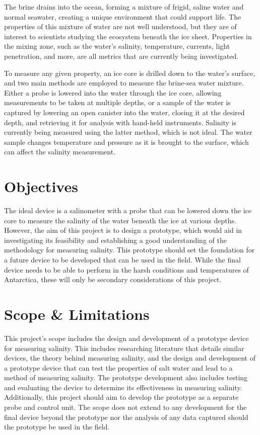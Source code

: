 The brine drains into the ocean, forming a mixture of frigid, saline water and normal seawater, creating a unique environment that could support life.
The properties of this mixture of water are not well understood, but they are of interest to scientists studying the ecosystem beneath the ice sheet.
Properties in the mixing zone, such as the water's salinity, temperature, currents, light penetration, and more, are all metrics that are currently being investigated.

To measure any given property, an ice core is drilled down to the water's surface, and two main methods are employed to measure the brine-sea water mixture.
Either a probe is lowered into the water through the ice core, allowing measurements to be taken at multiple depths, or a sample of the water is captured by lowering an open canister into the water, closing it at the desired depth, and retrieving it for analysis with hand-held instruments.
Salinity is currently being measured using the latter method, which is not ideal. The water sample changes temperature and pressure as it is brought to the surface, which can affect the salinity measurement.

\section{Objectives}
The ideal device is a salinometer with a probe that can be lowered down the ice core to measure the salinity of the water beneath the ice at various depths.
However, the aim of this project is to design a prototype, which would aid in investigating its feasibility and establishing a good understanding of the methodology for measuring salinity.
This prototype should set the foundation for a future device to be developed that can be used in the field.
While the final device needs to be able to perform in the harsh conditions and temperatures of Antarctica, these will only be secondary considerations of this project.


\section{Scope \& Limitations}
This project's scope includes the design and development of a prototype device for measuring salinity.
This includes researching literature that details similar devices, the theory behind measuring salinity, and the design and development of a prototype device that can test the properties of salt water and lead to a method of measuring salinity.
The prototype development also includes testing and evaluating the device to determine its effectiveness in measuring salinity.
Additionally, this project should aim to develop the prototype as a separate probe and control unit.
The scope does not extend to any development for the final device beyond the prototype nor the analysis of any data captured should the prototype be used in the field.

